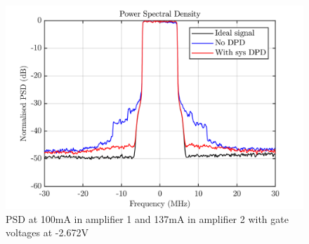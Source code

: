 \begin{figure}[H]
\centering 
\includegraphics[scale = 0.5]{figures/measurement/cree/meas5/psd_2p672v.png}
\caption{PSD at 100mA in amplifier 1 and 137mA in amplifier 2 with gate voltages at -2.672V}
\label{fig:meas5_9}
\end{figure}





 

